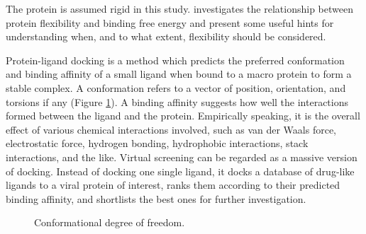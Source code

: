 The protein is assumed rigid in this study. \citep{1397} investigates the relationship between protein flexibility and binding free energy and present some useful hints for understanding when, and to what extent, flexibility should be considered.

Protein-ligand docking is a method which predicts the preferred conformation and binding affinity of a small ligand when bound to a macro protein to form a stable complex. A conformation refers to a vector of position, orientation, and torsions if any (Figure \ref{idock:DOF}). A binding affinity suggests how well the interactions formed between the ligand and the protein. Empirically speaking, it is the overall effect of various chemical interactions involved, such as van der Waals force, electrostatic force, hydrogen bonding, hydrophobic interactions, stack interactions, and the like. Virtual screening can be regarded as a massive version of docking. Instead of docking one single ligand, it docks a database of drug-like ligands to a viral protein of interest, ranks them according to their predicted binding affinity, and shortlists the best ones for further investigation.

\begin{figure}
\centering
{}
\caption{Conformational degree of freedom.}
\label{idock:DOF}
\end{figure}

